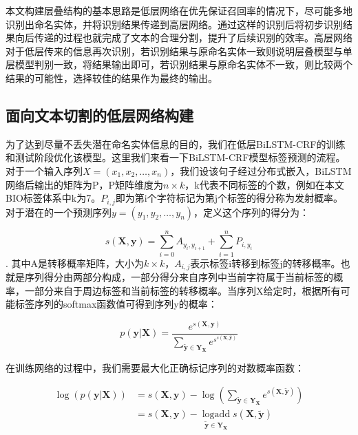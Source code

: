 \documentclass[winfonts,master,oneside,nobackinfo]{njuthesis}
\begin{document}
本文构建层叠结构的基本思路是低层网络在优先保证召回率的情况下，尽可能多地识别出命名实体，并将识别结果传递到高层网络。通过这样的识别后将初步识别结果向后传递的过程也就完成了文本的合理分割，提升了后续识别的效率。高层网络对于低层传来的信息再次识别，若识别结果与原命名实体一致则说明层叠模型与单层模型判别一致，将结果输出即可，若识别结果与原命名实体不一致，则比较两个结果的可能性，选择较佳的结果作为最终的输出。

\subsection{面向文本切割的低层网络构建}

为了达到尽量不丢失潜在命名实体信息的目的，我们在低层BiLSTM-CRF的训练和测试阶段优化该模型。这里我们来看一下BiLSTM-CRF模型标签预测的流程。对于一个输入序列$X=\left(x_{1}, x_{2}, \ldots, x_{n}\right)$，我们设该句子经过分布式嵌入，BiLSTM网络后输出的矩阵为P，P矩阵维度为$n \times k$，k代表不同标签的个数，例如在本文BIO标签体系中k为7。$P_{i, j}$即为第i个字符标记为第j个标签的得分称为发射概率。对于潜在的一个预测序列$y=\left(y_{1}, y_{2}, \ldots, y_{n}\right)$，定义这个序列的得分为：

\begin{equation} 
s(\bm{X}, \bm{y})=\sum_{i=0}^{n} A_{y_{i}, y_{i+1}}+\sum_{i=1}^{n} P_{i, y_{i}}
\end{equation}
.
其中A是转移概率矩阵，大小为$k \times k$，$A_{i, j}$表示标签i转移到标签j的转移概率。也就是序列得分由两部分构成，一部分得分来自序列中当前字符属于当前标签的概率，一部分来自于周边标签和当前标签的转移概率。当序列X给定时，根据所有可能标签序列的softmax函数值可得到序列y的概率：

\begin{equation} 
p(\bm{y} | \bm{X})=\frac{e^{s(\bm{X}, \bm{y})}}{\sum_{\tilde{\bm{y}} \in \bm{Y}_{\bm{X}}} e^{s^{s(\bm{X}, \overline{\bm{y}})}}}
\end{equation}

在训练网络的过程中，我们需要最大化正确标记序列的对数概率函数：

\begin{equation} 
\begin{aligned} \log (p(\bm{y} | \bm{X})) &=s(\bm{X}, \bm{y})-\log \left(\sum_{\tilde{\bm{y}} \in \bm{Y}_{\bm{X}}} e^{s(\bm{X}, \widetilde{\bm{y}})}\right) \\ &=s(\bm{X}, \bm{y})-\operatorname*{logadd}\limits_{\widetilde{\bm{y}} \in \bm{Y}_{\bm{X}}} s(\bm{X}, \widetilde{\bm{y}}) \end{aligned}
\end{equation}
\end{document}
